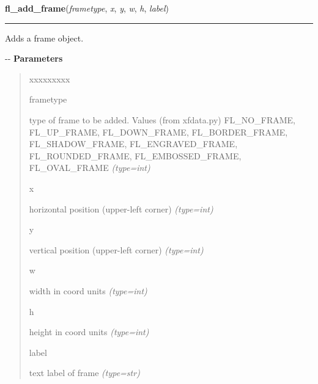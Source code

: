     \label{xformslib:flmisc:fl_add_frame}

    \vspace{0.5ex}

\hspace{.8\funcindent}\begin{boxedminipage}{\funcwidth}

    \raggedright \textbf{fl\_add\_frame}(\textit{frametype}, \textit{x}, \textit{y}, \textit{w}, \textit{h}, \textit{label})

    \vspace{-1.5ex}

    \rule{\textwidth}{0.5\fboxrule}
\setlength{\parskip}{2ex}

Adds a frame object.

-{}-
\setlength{\parskip}{1ex}
      \textbf{Parameters}
      \vspace{-1ex}

      \begin{quote}
        \begin{Ventry}{xxxxxxxxx}

          \item[frametype]


type of frame to be added. Values (from xfdata.py) FL\_NO\_FRAME,
FL\_UP\_FRAME, FL\_DOWN\_FRAME, FL\_BORDER\_FRAME, FL\_SHADOW\_FRAME,
FL\_ENGRAVED\_FRAME, FL\_ROUNDED\_FRAME, FL\_EMBOSSED\_FRAME, FL\_OVAL\_FRAME
            {\it (type=int)}

          \item[x]


horizontal position (upper-left corner)
            {\it (type=int)}

          \item[y]


vertical position (upper-left corner)
            {\it (type=int)}

          \item[w]


width in coord units
            {\it (type=int)}

          \item[h]


height in coord units
            {\it (type=int)}

          \item[label]


text label of frame
            {\it (type=str)}


\end{Ventry}
\end{quote}
\end{boxedminipage}
